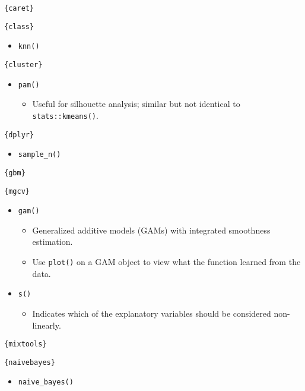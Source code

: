 \documentclass[
]{book}
\providecommand{\tightlist}{%
  \setlength{\itemsep}{0pt}\setlength{\parskip}{0pt}}
\begin{document}
\texttt{\{caret\}}

\texttt{\{class\}}

\begin{itemize}
\tightlist
\item
  \texttt{knn()}
\end{itemize}

\texttt{\{cluster\}}

\begin{itemize}
\tightlist
\item
  \texttt{pam()}

  \begin{itemize}
  \tightlist
  \item
    Useful for silhouette analysis; similar but not identical to \texttt{stats::kmeans()}.
  \end{itemize}
\end{itemize}

\texttt{\{dplyr\}}

\begin{itemize}
\tightlist
\item
  \texttt{sample\_n()}
\end{itemize}

\texttt{\{gbm\}}

\texttt{\{mgcv\}}

\begin{itemize}
\tightlist
\item
  \texttt{gam()}

  \begin{itemize}
  \tightlist
  \item
    Generalized additive models (GAMs) with integrated smoothness estimation.
  \item
    Use \texttt{plot()} on a GAM object to view what the function learned from the data.
  \end{itemize}
\item
  \texttt{s()}

  \begin{itemize}
  \tightlist
  \item
    Indicates which of the explanatory variables should be considered non-linearly.
  \end{itemize}
\end{itemize}

\texttt{\{mixtools\}}

\texttt{\{naivebayes\}}

\begin{itemize}
\tightlist
\item
  \texttt{naive\_bayes()}
\end{itemize}
\end{document}

